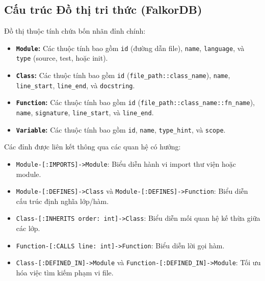 \documentclass[12pt,a4paper,oneside]{report}
\begin{document}
\subsection{Cấu trúc Đồ thị tri thức (FalkorDB)}
Đồ thị thuộc tính chứa bốn nhãn đỉnh chính:
\begin{itemize}
    \item \textbf{\texttt{Module}:} Các thuộc tính bao gồm \texttt{id} (đường dẫn file), \texttt{name}, \texttt{language}, và \texttt{type} (source, test, hoặc init).
    \item \textbf{\texttt{Class}:} Các thuộc tính bao gồm \texttt{id} (\texttt{file\_path::class\_name}), \texttt{name}, \texttt{line\_start}, \texttt{line\_end}, và \texttt{docstring}.
    \item \textbf{\texttt{Function}:} Các thuộc tính bao gồm \texttt{id} (\texttt{file\_path::class\_name::fn\_name}), \texttt{name}, \texttt{signature}, \texttt{line\_start}, và \texttt{line\_end}.
    \item \textbf{\texttt{Variable}:} Các thuộc tính bao gồm \texttt{id}, \texttt{name}, \texttt{type\_hint}, và \texttt{scope}.
\end{itemize}

Các đỉnh được liên kết thông qua các quan hệ có hướng:
\begin{itemize}
    \item \texttt{Module-[:IMPORTS]->Module}: Biểu diễn hành vi import thư viện hoặc module.
    \item \texttt{Module-[:DEFINES]->Class} và \texttt{Module-[:DEFINES]->Function}: Biểu diễn cấu trúc định nghĩa lớp/hàm.
    \item \texttt{Class-[:INHERITS {order: int}]->Class}: Biểu diễn mối quan hệ kế thừa giữa các lớp.
    \item \texttt{Function-[:CALLS {line: int}]->Function}: Biểu diễn lời gọi hàm.
    \item \texttt{Class-[:DEFINED\_IN]->Module} và \texttt{Function-[:DEFINED\_IN]->Module}: Tối ưu hóa việc tìm kiếm phạm vi file.
\end{itemize}
\end{document}
